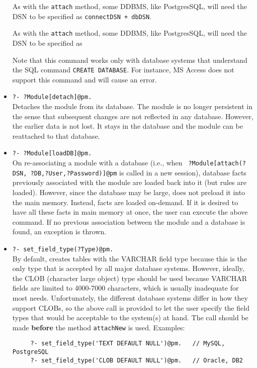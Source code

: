 \begin{itemize}
  As with the \texttt{attach} method, some DDBMS, like PostgresSQL, will
  need the DSN to be specified as \texttt{connectDSN + dbDSN}.
  
  As with the \texttt{attach} method, some DDBMS, like PostgresSQL, will
  need the DSN to be specified as 
  
  Note that this command works only with database systems that understand
  the SQL command {\tt CREATE DATABASE}. For instance, MS Access does not
  support this command and will cause an error.
\item {\tt ?- ?Module[detach]@pm.}\\
  Detaches the module from its database. The module is no longer persistent
  in the sense that subsequent changes are not reflected in any database.
  However, the earlier data is not lost. It stays in the database and the
  module can be reattached to that database.
\item {\tt ?- ?Module[loadDB]@pm.}\\
  On re-associating a module with a database (i.e., when {\tt
    ?Module[attach(?DSN, ?DB,?User,?Password)]@pm} is called in a new
  \FLSYSTEM session), database facts previously associated with the module are
  loaded back into it (but rules are loaded).  However, since the database may be large, \FLSYSTEM
  does not preload it into the main memory. Instead, facts are loaded
  on-demand.  If it is desired to have all these facts in main
  memory at once, the user can execute the above command. If no previous
  association between the module and a database is found, an exception is
  thrown.
\item \texttt{?- set\_field\_type(?Type)@pm.} \\  
  By default, \FLSYSTEM creates tables with the VARCHAR field type because
  this is the only type that is accepted by all major database systems.
  However, ideally, the CLOB (character large object) type should be used
  because VARCHAR fields are limited to 4000-7000 characters, which is
  usually inadequate for most needs.
  Unfortunately, the different database systems differ in how they support
  CLOBs, so the above call is provided to let the user specify the field types
  that would be acceptable to the system(s) at hand. The call should be
  made \textbf{before} the method \texttt{attachNew} is used. Examples:
\begin{verbatim}
     ?- set_field_type('TEXT DEFAULT NULL')@pm.   // MySQL, PostgreSQL
     ?- set_field_type('CLOB DEFAULT NULL')@pm.   // Oracle, DB2
\end{verbatim}
\end{itemize}



